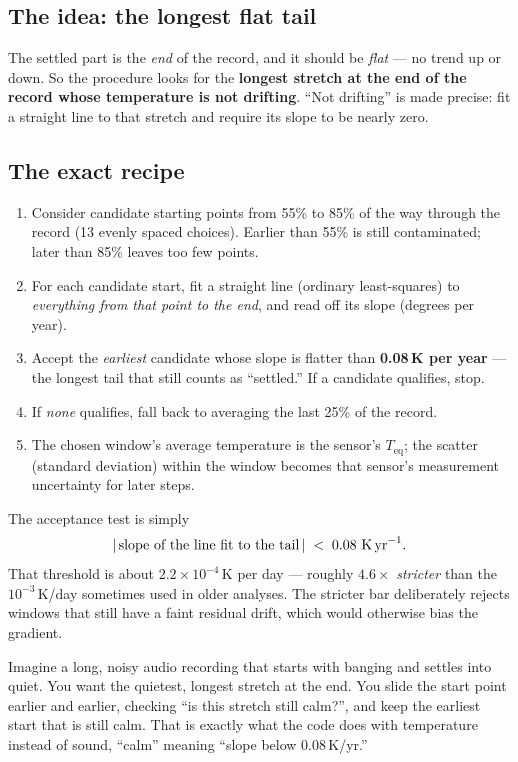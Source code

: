 \documentclass[11pt]{article}
\begin{document}
\subsection{The idea: the longest flat tail}
The settled part is the \emph{end} of the record, and it should be
\emph{flat} --- no trend up or down. So the procedure looks for the
\textbf{longest stretch at the end of the record whose temperature is
not drifting}. ``Not drifting'' is made precise: fit a straight line to
that stretch and require its slope to be nearly zero.

\subsection{The exact recipe}
\begin{enumerate}
\item Consider candidate starting points from 55\% to 85\% of the way
      through the record (13 evenly spaced choices). Earlier than 55\% is
      still contaminated; later than 85\% leaves too few points.
\item For each candidate start, fit a straight line (ordinary
      least-squares) to \emph{everything from that point to the end}, and
      read off its slope (degrees per year).
\item Accept the \emph{earliest} candidate whose slope is flatter than
      \textbf{0.08\,K per year} --- the longest tail that still counts as
      ``settled.'' If a candidate qualifies, stop.
\item If \emph{none} qualifies, fall back to averaging the last 25\% of
      the record.
\item The chosen window's average temperature is the sensor's
      $T_\text{eq}$; the scatter (standard deviation) within the window
      becomes that sensor's measurement uncertainty for later steps.
\end{enumerate}

\begin{mathbox}
The acceptance test is simply
\[
\left|\,\text{slope of the line fit to the tail}\,\right|
\;<\; 0.08~\text{K\,yr}^{-1}.
\]
That threshold is about $2.2\times10^{-4}$\,K per day --- roughly
$4.6\times$ \emph{stricter} than the $10^{-3}$\,K/day sometimes used in
older analyses. The stricter bar deliberately rejects windows that still
have a faint residual drift, which would otherwise bias the gradient.
\end{mathbox}

\begin{plainbox}
Imagine a long, noisy audio recording that starts with banging and
settles into quiet. You want the quietest, longest stretch at the end.
You slide the start point earlier and earlier, checking ``is this
stretch still calm?'', and keep the earliest start that is still calm.
That is exactly what the code does with temperature instead of sound,
``calm'' meaning ``slope below 0.08\,K/yr.''
\end{plainbox}
\end{document}
